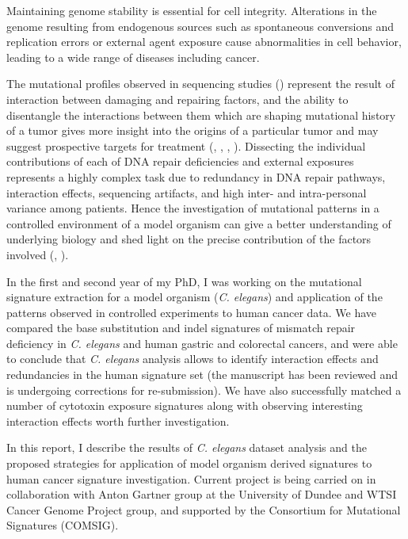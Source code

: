 \documentclass[12pt,a4paper,oneside]{article}
\begin{document}
Maintaining genome stability is essential for cell integrity. Alterations in the genome resulting from endogenous sources such as spontaneous conversions and replication errors or external agent exposure cause abnormalities in cell behavior, leading to a wide range of diseases including cancer.

The mutational profiles observed in sequencing studies (\cite{Alex1}) represent the result of interaction between damaging and repairing factors, and the ability to disentangle the interactions between them which are shaping mutational history of a tumor gives more insight into the origins of a particular tumor and may suggest prospective targets for treatment (\cite{Alex1}, \cite{Alex5}, \cite{Hollstein}, \cite{Poon1}). Dissecting the individual contributions of each of DNA repair deficiencies and external exposures represents a highly complex task due to  redundancy in DNA repair pathways, interaction effects, sequencing artifacts, and high inter- and intra-personal variance among patients. Hence the investigation of mutational patterns in a controlled environment of a model organism can give a better understanding of underlying biology and shed light on the precise contribution of the factors involved (\cite{Meier1}, \cite{Segovia}).

In the first and second year of my PhD, I was working on the mutational signature extraction for a model organism (\textit{C. elegans}) and application of the patterns observed in controlled experiments to human cancer data. We have compared the base substitution and indel signatures of mismatch repair deficiency in \textit{C. elegans} and human gastric and colorectal cancers, and were able to conclude that \textit{C. elegans} analysis allows to identify interaction effects and redundancies in the human signature set (the manuscript has been reviewed and is undergoing corrections for re-submission). We have also successfully matched a number of cytotoxin exposure signatures along with observing interesting interaction effects worth further investigation. 

In this report, I describe the results of \textit{C. elegans} dataset analysis and the proposed strategies for application of model organism derived signatures to human cancer signature investigation. Current project is being carried on in collaboration with Anton Gartner group at the University of Dundee and WTSI Cancer Genome Project group, and supported by the Consortium for Mutational Signatures (COMSIG).
\end{document}
